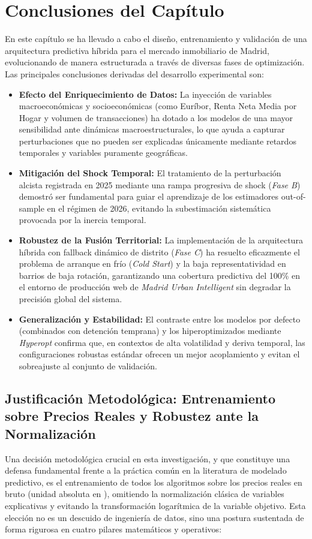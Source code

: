 \documentclass[a4paper,11pt,openany]{book}
\begin{document}
\section{Conclusiones del Capítulo}
En este capítulo se ha llevado a cabo el diseño, entrenamiento y validación de una arquitectura predictiva híbrida para el mercado inmobiliario de Madrid, evolucionando de manera estructurada a través de diversas fases de optimización. Las principales conclusiones derivadas del desarrollo experimental son:
\begin{itemize}
    \item \textbf{Efecto del Enriquecimiento de Datos:} La inyección de variables macroeconómicas y socioeconómicas (como Euríbor, Renta Neta Media por Hogar y volumen de transacciones) ha dotado a los modelos de una mayor sensibilidad ante dinámicas macroestructurales, lo que ayuda a capturar perturbaciones que no pueden ser explicadas únicamente mediante retardos temporales y variables puramente geográficas.
    \item \textbf{Mitigación del Shock Temporal:} El tratamiento de la perturbación alcista registrada en 2025 mediante una rampa progresiva de shock (\textit{Fase B}) demostró ser fundamental para guiar el aprendizaje de los estimadores out-of-sample en el régimen de 2026, evitando la subestimación sistemática provocada por la inercia temporal.
    \item \textbf{Robustez de la Fusión Territorial:} La implementación de la arquitectura híbrida con fallback dinámico de distrito (\textit{Fase C}) ha resuelto eficazmente el problema de arranque en frío (\textit{Cold Start}) y la baja representatividad en barrios de baja rotación, garantizando una cobertura predictiva del 100\% en el entorno de producción web de \textit{Madrid Urban Intelligent} sin degradar la precisión global del sistema.
    \item \textbf{Generalización y Estabilidad:} El contraste entre los modelos por defecto (combinados con detención temprana) y los hiperoptimizados mediante \textit{Hyperopt} confirma que, en contextos de alta volatilidad y deriva temporal, las configuraciones robustas estándar ofrecen un mejor acoplamiento y evitan el sobreajuste al conjunto de validación.
\end{itemize}

\subsection{Justificación Metodológica: Entrenamiento sobre Precios Reales y Robustez ante la Normalización}
Una decisión metodológica crucial en esta investigación, y que constituye una defensa fundamental frente a la práctica común en la literatura de modelado predictivo, es el entrenamiento de todos los algoritmos sobre los precios reales en bruto (unidad absoluta en ), omitiendo la normalización clásica de variables explicativas y evitando la transformación logarítmica de la variable objetivo. Esta elección no es un descuido de ingeniería de datos, sino una postura sustentada de forma rigurosa en cuatro pilares matemáticos y operativos:
\end{document}
